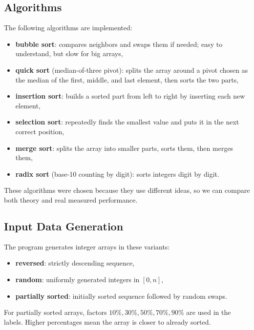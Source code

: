 \documentclass[11pt,a4paper]{article}
\begin{document}
\subsection{Algorithms}
The following algorithms are implemented:
\begin{itemize}
    \item \textbf{bubble sort}: compares neighbors and swaps them if needed; easy to understand, but slow for big arrays,
    \item \textbf{quick sort} (median-of-three pivot): splits the array around a pivot chosen as the median of the first, middle, and last element, then sorts the two parts,
    \item \textbf{insertion sort}: builds a sorted part from left to right by inserting each new element,
    \item \textbf{selection sort}: repeatedly finds the smallest value and puts it in the next correct position,
    \item \textbf{merge sort}: splits the array into smaller parts, sorts them, then merges them,
    \item \textbf{radix sort} (base-10 counting by digit): sorts integers digit by digit.
\end{itemize}

These algorithms were chosen because they use different ideas, so we can compare both theory and real measured performance.

\subsection{Input Data Generation}
The program generates integer arrays in these variants:
\begin{itemize}
    \item \textbf{reversed}: strictly descending sequence,
    \item \textbf{random}: uniformly generated integers in \([0, n]\),
    \item \textbf{partially sorted}: initially sorted sequence followed by random swaps.
\end{itemize}

For partially sorted arrays, factors \(10\%, 30\%, 50\%, 70\%, 90\%\) are used in the labels. Higher percentages mean the array is closer to already sorted.
\end{document}
